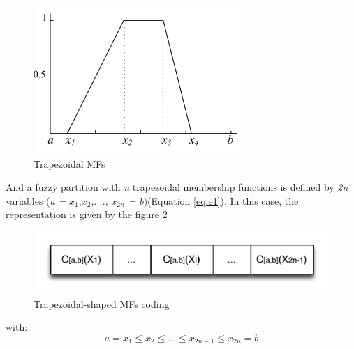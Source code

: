 \documentclass[conference]{IEEEtran}
\begin{document}
\begin{figure}[!ht] 
	\begin{center}
		\includegraphics[scale=0.7]{fig/trapese}
		\caption {Trapezoidal MFs}
		\label{fig:trapeze}
	\end{center}
\end{figure}
And a fuzzy partition with \textit{n} trapezoidal membership functions
is defined by \textit{2n} variables (\textit{a =} $ x_{1}$,$x_{2}
$,. .., $x_{2n} $ \textit {= b})(Equation \ref{eq:e1}). In this case,
the representation is given by the
figure \ref{fig:at} 
\begin{figure}[!ht] 
	\begin{center}
		\includegraphics[scale=0.55]{fig/trapezoidal.png}
		\caption {Trapezoidal-shaped MFs coding}
		\label{fig:at}
	\end{center}
\end{figure}
with:
\begin{equation}
a = x_{1} \leq x_{2} \leq...\leq x_{2n-1} \leq x_{2n}=b 	
\end{equation}		
\end{document}
